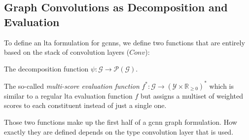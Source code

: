 \subsection{Graph Convolutions as Decomposition and Evaluation}%
\label{sec:ltag:formulation:gcnn:conv}

To define an \ac{lta} formulation for \acp{gcnn}, we define two functions that are entirely based on the stack of convolution layers ($\mathit{Conv}$):
\begin{enumerate*}
	\item The decomposition function $\psi: \mathcal{G} \to \mathcal{P}(\mathcal{G})$.
	\item The so-called \textit{multi-score evaluation function} $f^{*}: \mathcal{G} \to {(\mathcal{Y} \times \mathbb{R}_{\geq 0})}^{*}$ which is similar to a regular \ac{lta} evaluation function $f$ but assigns a multiset of weighted scores to each constituent instead of just a single one.
\end{enumerate*}
Those two functions make up the first half of a \ac{gcnn} graph formulation.
How exactly they are defined depends on the type convolution layer that is used.

